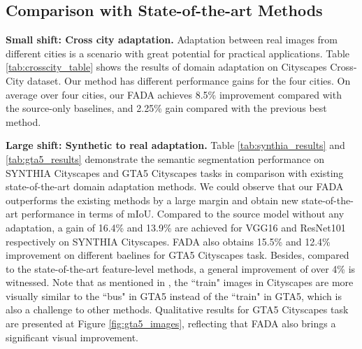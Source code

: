 \documentclass[runningheads]{llncs}
\begin{document}
\subsection{Comparison with State-of-the-art Methods}
\noindent\textbf{Small shift: Cross city adaptation.}\quad
Adaptation between real images from different cities is a scenario with great potential for practical applications. Table \ref{tab:crosscity_table} shows the results of domain adaptation on Cityscapes  Cross-City dataset. 
Our method has different performance gains for the four cities. 
On average over four cities, our FADA achieves 8.5\% improvement compared with the source-only baselines, and 2.25\% gain compared with the previous best method.


\noindent\textbf{Large shift: Synthetic to real adaptation.}\quad
Table \ref{tab:synthia_results} and \ref{tab:gta5_results}  demonstrate the semantic segmentation performance on SYNTHIA  Cityscapes and GTA5  Cityscapes tasks in comparison with existing state-of-the-art domain adaptation methods. We could observe that our FADA outperforms the existing methods by a large margin and obtain new state-of-the-art performance in terms of mIoU. Compared to the source model without any adaptation, a gain of 16.4\% and 13.9\% are achieved for VGG16 and ResNet101 respectively on SYNTHIA  Cityscapes. FADA also obtains 15.5\% and 12.4\% improvement on different baelines for GTA5  Cityscapes task. Besides, compared to the state-of-the-art feature-level methods, a general improvement of over 4\% is witnessed. 
Note that as mentioned in \cite{Zhang_2017_ICCV_CDA}, the ``train" images in Cityscapes are more visually similar to the ``bus" in GTA5 instead of the ``train" in GTA5, which is also a challenge to other methods. Qualitative results for GTA5  Cityscapes task are presented at Figure \ref{fig:gta5_images}, reflecting that FADA also brings a significant visual improvement.
\end{document}
